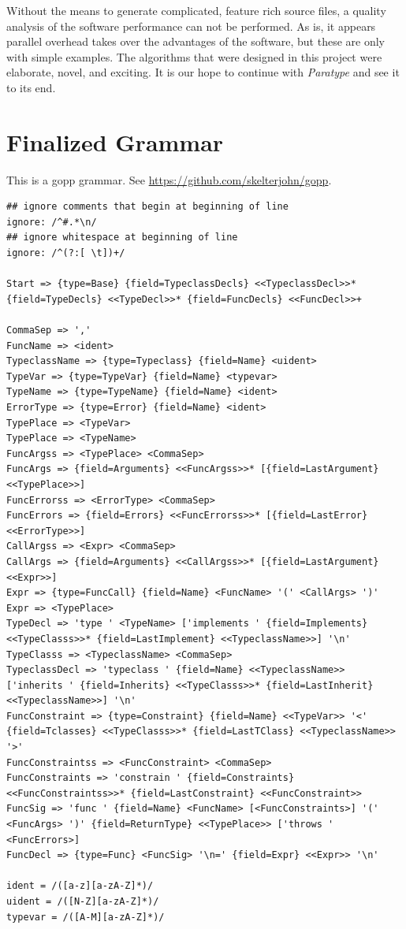 \documentclass{acm_proc_article-sp}
\begin{document}
Without the means to generate complicated, feature rich source files, a quality
analysis of the software performance can not be performed. As is, it appears
parallel overhead takes over the advantages of the software, but these are only
with simple examples. The algorithms that were designed in this project were
elaborate, novel, and exciting. It is our hope to continue with \emph{Paratype}
and see it to its end.

\appendix
\section{Finalized Grammar}

This is a gopp grammar. See \url{https://github.com/skelterjohn/gopp}.

\begin{lstlisting}[language=Gopp]
## ignore comments that begin at beginning of line
ignore: /^#.*\n/
## ignore whitespace at beginning of line
ignore: /^(?:[ \t])+/

Start => {type=Base} {field=TypeclassDecls} <<TypeclassDecl>>* {field=TypeDecls} <<TypeDecl>>* {field=FuncDecls} <<FuncDecl>>+

CommaSep => ','
FuncName => <ident>
TypeclassName => {type=Typeclass} {field=Name} <uident>
TypeVar => {type=TypeVar} {field=Name} <typevar>
TypeName => {type=TypeName} {field=Name} <ident>
ErrorType => {type=Error} {field=Name} <ident>
TypePlace => <TypeVar>
TypePlace => <TypeName>
FuncArgss => <TypePlace> <CommaSep>
FuncArgs => {field=Arguments} <<FuncArgss>>* [{field=LastArgument} <<TypePlace>>]
FuncErrorss => <ErrorType> <CommaSep>
FuncErrors => {field=Errors} <<FuncErrorss>>* [{field=LastError} <<ErrorType>>]
CallArgss => <Expr> <CommaSep>
CallArgs => {field=Arguments} <<CallArgss>>* [{field=LastArgument} <<Expr>>]
Expr => {type=FuncCall} {field=Name} <FuncName> '(' <CallArgs> ')'
Expr => <TypePlace>
TypeDecl => 'type ' <TypeName> ['implements ' {field=Implements} <<TypeClasss>>* {field=LastImplement} <<TypeclassName>>] '\n'
TypeClasss => <TypeclassName> <CommaSep>
TypeclassDecl => 'typeclass ' {field=Name} <<TypeclassName>> ['inherits ' {field=Inherits} <<TypeClasss>>* {field=LastInherit} <<TypeclassName>>] '\n'
FuncConstraint => {type=Constraint} {field=Name} <<TypeVar>> '<' {field=Tclasses} <<TypeClasss>>* {field=LastTClass} <<TypeclassName>> '>'
FuncConstraintss => <FuncConstraint> <CommaSep>
FuncConstraints => 'constrain ' {field=Constraints} <<FuncConstraintss>>* {field=LastConstraint} <<FuncConstraint>>
FuncSig => 'func ' {field=Name} <FuncName> [<FuncConstraints>] '(' <FuncArgs> ')' {field=ReturnType} <<TypePlace>> ['throws ' <FuncErrors>]
FuncDecl => {type=Func} <FuncSig> '\n=' {field=Expr} <<Expr>> '\n'

ident = /([a-z][a-zA-Z]*)/
uident = /([N-Z][a-zA-Z]*)/
typevar = /([A-M][a-zA-Z]*)/
	\end{lstlisting}
\end{document}
